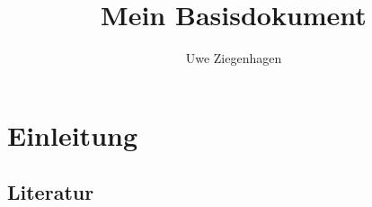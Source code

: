 \documentclass[12pt,ngerman,parskip=half]{scrreprt}
\author{Uwe Ziegenhagen}
\title{Mein Basisdokument}
\begin{document}
\maketitle

\tableofcontents

\listoffigures

\chapter{Einleitung}

\section{Literatur}

\blindtext[2]

\blindtext[2]
\end{document}
